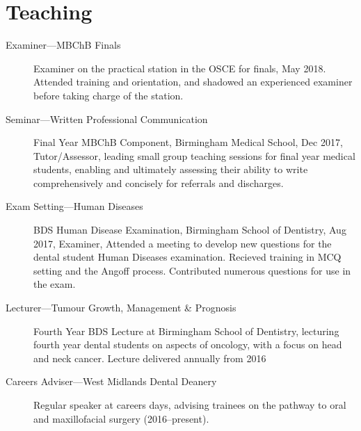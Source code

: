 \section*{Teaching}
\begin{description}
	\item[Examiner---MBChB Finals]{Examiner on the practical station in the OSCE for finals, May 2018. Attended training and orientation, and shadowed an experienced examiner before taking charge of the station.}
	\item[Seminar---Written Professional Communication]{Final Year MBChB Component, Birmingham Medical School, Dec 2017, Tutor/Assessor, leading small group teaching sessions for final year medical students, enabling and ultimately assessing their ability to write comprehensively and concisely for referrals and discharges.}
	\item[Exam Setting---Human Diseases]{BDS Human Disease Examination, Birmingham School of Dentistry, Aug 2017, Examiner, Attended a meeting to develop new questions for the dental student Human Diseases examination. Recieved training in MCQ setting and the Angoff process. Contributed numerous questions for use in the exam.}
	\item[Lecturer---Tumour Growth, Management \& Prognosis]{Fourth Year BDS Lecture at Birmingham School of Dentistry, lecturing fourth year dental students on aspects of oncology, with a focus on head and neck cancer. Lecture delivered annually from 2016}
	\item[Careers Adviser---West Midlands Dental Deanery]{Regular speaker at careers days, advising trainees on the pathway to oral and maxillofacial surgery (2016--present).}
\end{description}

